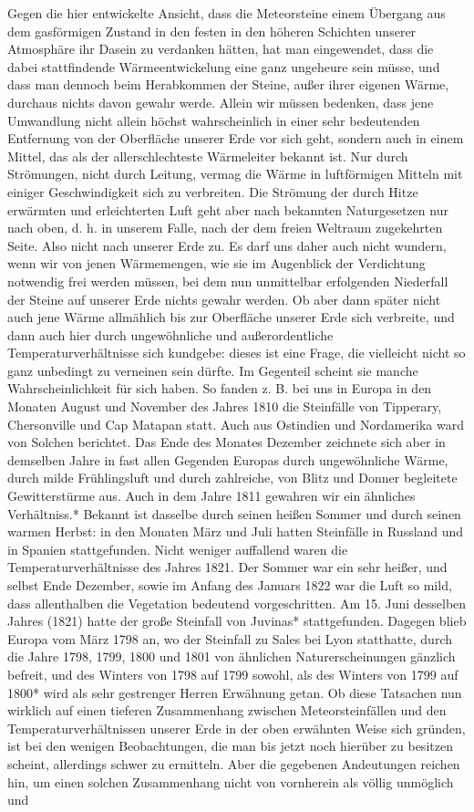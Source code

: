 \documentclass[a4paper, 8pt, oneside, polutonikogreek, german]{article}
\begin{document}
Gegen die hier entwickelte Ansicht, dass die Meteorsteine einem Übergang aus dem gasförmigen Zustand in den festen in den höheren Schichten unserer Atmosphäre ihr Dasein zu verdanken hätten, hat man eingewendet, dass die dabei stattfindende Wärmeentwickelung eine ganz ungeheure sein müsse, und dass man dennoch beim Herabkommen der Steine, außer ihrer eigenen Wärme, durchaus nichts davon gewahr werde. Allein wir müssen bedenken, dass jene Umwandlung nicht allein höchst wahrscheinlich in einer sehr bedeutenden Entfernung von der Oberfläche unserer Erde vor sich geht, sondern auch in einem Mittel, das als der allerschlechteste Wärmeleiter bekannt ist. Nur durch Strömungen, nicht durch Leitung, vermag die Wärme in luftförmigen Mitteln mit einiger Geschwindigkeit sich zu verbreiten. Die Strömung der durch Hitze erwärmten und erleichterten Luft geht aber nach bekannten Naturgesetzen nur nach oben, d. h. in unserem Falle, nach der dem freien Weltraum zugekehrten Seite. Also nicht nach unserer Erde zu. Es darf uns daher auch nicht wundern, wenn wir von jenen Wärmemengen, wie sie im Augenblick der Verdichtung notwendig frei werden müssen, bei dem nun unmittelbar erfolgenden Niederfall der Steine auf unserer Erde nichts gewahr werden. Ob aber dann später nicht auch jene Wärme allmählich bis zur Oberfläche unserer Erde sich verbreite, und dann auch hier durch ungewöhnliche und außerordentliche Temperaturverhältnisse sich kundgebe: dieses ist eine Frage, die vielleicht nicht so ganz unbedingt zu verneinen sein dürfte. Im Gegenteil scheint sie manche Wahrscheinlichkeit für sich haben. So fanden z. B. bei uns in Europa in den Monaten August und November des Jahres 1810 die Steinfälle von Tipperary, Chersonville und Cap Matapan statt. Auch aus Ostindien und Nordamerika ward von Solchen berichtet. Das Ende des Monates Dezember zeichnete sich aber in demselben Jahre in fast allen Gegenden Europas durch ungewöhnliche Wärme, durch milde Frühlingsluft und durch zahlreiche, von Blitz und Donner begleitete Gewitterstürme aus. Auch in dem Jahre 1811 gewahren wir ein ähnliches Verhältniss.* Bekannt ist dasselbe durch seinen heißen Sommer und durch seinen warmen Herbst: in den Monaten März und Juli hatten Steinfälle in Russland und in Spanien stattgefunden. Nicht weniger auffallend waren die Temperaturverhältnisse des Jahres 1821. Der Sommer war ein sehr heißer, und selbst Ende Dezember, sowie im Anfang des Januars 1822 war die Luft so mild, dass allenthalben die Vegetation bedeutend vorgeschritten. Am 15. Juni desselben Jahres (1821) hatte der große Steinfall von Juvinas* stattgefunden. Dagegen blieb Europa vom März 1798 an, wo der Steinfall zu Sales bei Lyon statthatte, durch die Jahre 1798, 1799, 1800 und 1801 von ähnlichen Naturerscheinungen gänzlich befreit, und des Winters von 1798 auf 1799 sowohl, als des Winters von 1799 auf 1800* wird als sehr gestrenger Herren Erwähnung getan. Ob diese Tatsachen nun wirklich auf einen tieferen Zusammenhang zwischen Meteorsteinfällen und den Temperaturverhältnissen unserer Erde in der oben erwähnten Weise sich gründen, ist bei den wenigen Beobachtungen, die man bis jetzt noch hierüber zu besitzen scheint, allerdings schwer zu ermitteln. Aber die gegebenen Andeutungen reichen hin, um einen solchen Zusammenhang nicht von vornherein als völlig unmöglich und 
\end{document}
